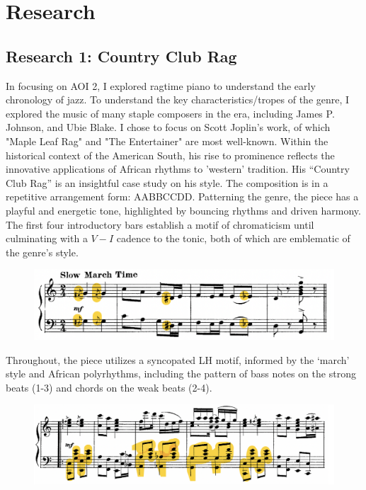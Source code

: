 \documentclass[12pt]{article}
\begin{document}
\section{Research}

\subsection{Research 1: Country Club Rag}

In focusing on AOI 2, I explored ragtime piano to understand the early chronology of jazz. To understand the key characteristics/tropes of the genre, I explored the music of many staple composers in the era, including James P. Johnson, and Ubie Blake. I chose to focus on Scott Joplin’s work, of which "Maple Leaf Rag" and "The Entertainer" are most well-known. Within the historical context of the American South, his rise to prominence reflects the innovative applications of African rhythms to 'western' tradition.\autocite[45]{joplinArticle}
His “Country Club Rag” is an insightful case study on his style. The composition is in a repetitive arrangement form: AABBCCDD. Patterning the genre, the piece has a playful and energetic tone, highlighted by bouncing rhythms and driven harmony. The first four introductory bars establish a motif of chromaticism until culminating with a $V-I$ cadence to the tonic, both of which are emblematic of the genre's style.
\begin{figure}[H]
\begin{center}
\includegraphics[width=0.7\linewidth]{joplin1}
\end{center}
\end{figure}
Throughout, the piece utilizes a syncopated LH motif, informed by the ‘march’ style and African polyrhythms, including the pattern of bass notes on the strong beats (1-3) and chords on the weak beats (2-4). 
\begin{figure}[H]
\begin{center}
\includegraphics[width=0.7\linewidth]{joplin2}
\end{center}
\end{figure}
\end{document}
